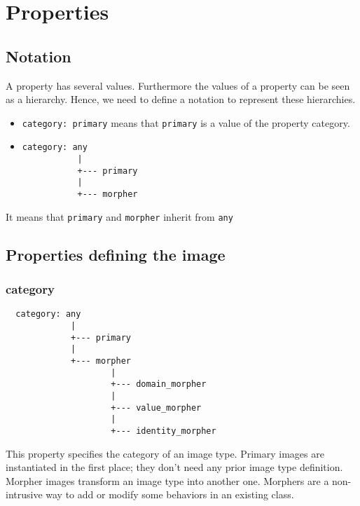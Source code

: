 \section{Properties}



\subsection{Notation}

A property has several values.
Furthermore the values of a property can be seen as a hierarchy.
Hence, we need to define a notation to represent these hierarchies.
\begin{itemize}

\item \verb+category: primary+ means that \verb+primary+ is a value of the
property category.

\item
\begin{verbatim}
category: any
           |
           +--- primary
           |
           +--- morpher
\end{verbatim}
\end{itemize} It means that \verb+primary+ and \verb+morpher+ inherit from
\verb+any+

\subsection{Properties defining the image}

\subsubsection{category}


\begin{verbatim}
  category: any
             |
             +--- primary
             |
             +--- morpher
                     |
                     +--- domain_morpher
                     |
                     +--- value_morpher
                     |
                     +--- identity_morpher
\end{verbatim}


This property specifies the category of an image type.
Primary images are instantiated in the first place; they don't need any
prior image type definition.
Morpher images transform an image type into another one.
Morphers are a non-intrusive way to add or modify some behaviors in an
existing class.


